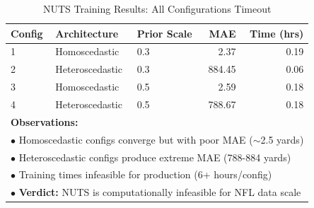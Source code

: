 \begin{table}[htbp]
\centering
\caption{NUTS Training Results: All Configurations Timeout}
\label{tab:nuts_timeout_results}
\begin{tabular}{lllrr}
\toprule
\textbf{Config} & \textbf{Architecture} & \textbf{Prior Scale} & \textbf{MAE} & \textbf{Time (hrs)} \\
\midrule
1 & Homoscedastic & 0.3 & 2.37 & 0.19 \\
2 & Heteroscedastic & 0.3 & 884.45 & 0.06 \\
3 & Homoscedastic & 0.5 & 2.59 & 0.18 \\
4 & Heteroscedastic & 0.5 & 788.67 & 0.18 \\
\midrule
\multicolumn{5}{l}{\textbf{Observations:}} \\
\multicolumn{5}{l}{$\bullet$ Homoscedastic configs converge but with poor MAE ($\sim$2.5 yards)} \\
\multicolumn{5}{l}{$\bullet$ Heteroscedastic configs produce extreme MAE (788-884 yards)} \\
\multicolumn{5}{l}{$\bullet$ Training times infeasible for production (6+ hours/config)} \\
\multicolumn{5}{l}{$\bullet$ \textbf{Verdict:} NUTS is computationally infeasible for NFL data scale} \\
\bottomrule
\end{tabular}
\end{table}



